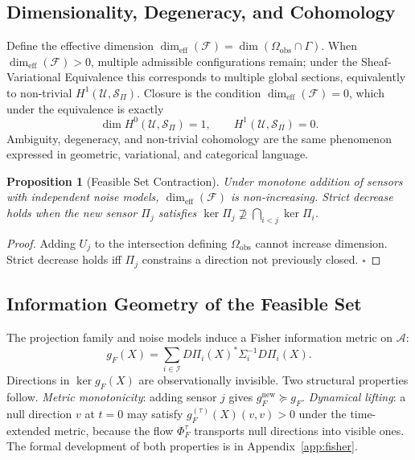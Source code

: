 \documentclass[12pt, oneside]{article}
\newtheorem{proposition}[theorem]{Proposition}
\begin{document}
\subsection{Dimensionality, Degeneracy, and Cohomology}

Define the effective dimension $\dim_{\mathrm{eff}}(\mathcal{F}) = \dim(\Omega_{\mathrm{obs}}
\cap \Gamma)$. When $\dim_{\mathrm{eff}}(\mathcal{F}) > 0$, multiple admissible
configurations remain; under the Sheaf-Variational Equivalence this corresponds to
multiple global sections, equivalently to non-trivial $H^1(\mathcal{U}, \mathcal{S}_\Pi)$.
Closure is the condition $\dim_{\mathrm{eff}}(\mathcal{F}) = 0$, which under the
equivalence is exactly
\[
\dim H^0(\mathcal{U}, \mathcal{S}_\Pi) = 1, \qquad H^1(\mathcal{U}, \mathcal{S}_\Pi) = 0.
\]
Ambiguity, degeneracy, and non-trivial cohomology are the same phenomenon expressed in
geometric, variational, and categorical language.

\begin{proposition}[Feasible Set Contraction]
\label{prop:contraction}
Under monotone addition of sensors with independent noise models, $\dim_{\mathrm{eff}}(\mathcal{F})$
is non-increasing. Strict decrease holds when the new sensor $\Pi_j$ satisfies
$\ker \Pi_j \not\supseteq \bigcap_{i < j} \ker \Pi_i$.
\end{proposition}
\begin{proof}
Adding $U_j$ to the intersection defining $\Omega_{\mathrm{obs}}$ cannot increase
dimension. Strict decrease holds iff $\Pi_j$ constrains a direction not previously closed.
$\square$
\end{proof}

\subsection{Information Geometry of the Feasible Set}

The projection family and noise models induce a Fisher information metric on $\mathcal{A}$:
\[
g_F(X) = \sum_{i \in \mathcal{I}} D\Pi_i(X)^* \Sigma_i^{-1} D\Pi_i(X).
\]
Directions in $\ker g_F(X)$ are observationally invisible. Two structural properties
follow. \emph{Metric monotonicity}: adding sensor $j$ gives
$g_F^{\mathrm{new}} \succeq g_F$. \emph{Dynamical lifting}: a null direction $v$ at
$t = 0$ may satisfy $g_F^{(\tau)}(X)(v,v) > 0$ under the time-extended metric, because
the flow $\Phi_F^\tau$ transports null directions into visible ones. The formal
development of both properties is in Appendix~\ref{app:fisher}.
\end{document}
